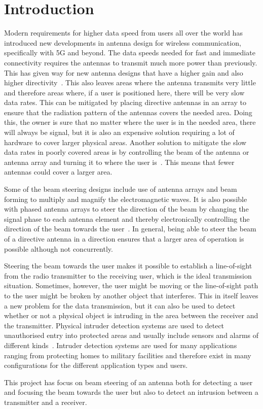 \chapter{Introduction}
Modern requirements for higher data speed from users all over the world has introduced new developments in antenna design for wireless communication, specifically with 5G and beyond. The data speeds needed for fast and immediate connectivity requires the antennas to transmit much more power than previously. This has given way for new antenna designs that have a higher gain and also higher directivity~\cite{beamsteering}. This also leaves areas where the antenna transmits very little and therefore areas where, if a user is positioned here, there will be very slow data rates. This can be mitigated by placing directive antennas in an array to ensure that the radiation pattern of the antennas covers the needed area. Doing this, the owner is sure that no matter where the user is in the needed area, there will always be signal, but it is also an expensive solution requiring a lot of hardware to cover larger physical areas. Another solution to mitigate the slow data rates in poorly covered areas is by controlling the beam of the antenna or antenna array and turning it to where the user is~\cite{beamsteering}. This means that fewer antennas could cover a larger area. 

Some of the beam steering designs include use of antenna arrays and beam forming to multiply and magnify the electromagnetic waves. It is also possible with phased antenna arrays to steer the direction of the beam by changing the signal phase to each antenna element and thereby electronically controlling the direction of the beam towards the user~\cite{beamsteering}. In general, being able to steer the beam of a directive antenna in a direction ensures that a larger area of operation is possible although not concurrently.

Steering the beam towards the user makes it possible to establish a line-of-sight from the radio transmitter to the receiving user, which is the ideal transmission situation. Sometimes, however, the user might be moving or the line-of-sight path to the user might be broken by another object that interferes. This in itself leaves a new problem for the data transmission, but it can also be used to detect whether or not a physical object is intruding in the area between the receiver and the transmitter. Physical intruder detection systems are used to detect unauthorised entry into protected areas and usually include sensors and alarms of different kinds~\cite{ids}. Intruder detection systems are used for many applications ranging from protecting homes to military facilities and therefore exist in many configurations for the different application types and users.

This project has focus on beam steering of an antenna both for detecting a user and focusing the beam towards the user but also to detect an intrusion between a transmitter and a receiver.